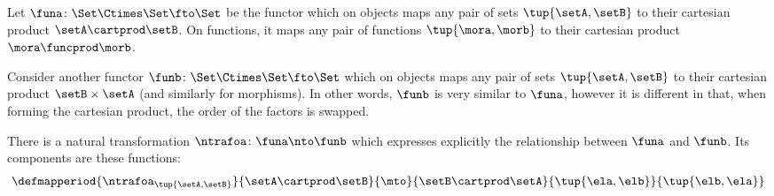 \begin{example}
    Let $\funa \colon \Set \Ctimes \Set \fto \Set$ be the functor which on objects maps any pair of sets $\tup{\setA, \setB}$ to their cartesian product $\setA \cartprod \setB$.
    On functions, it maps any pair of functions $\tup{\mora, \morb}$ to their cartesian product $\mora \funcprod \morb$.

    Consider another functor $\funb \colon \Set \Ctimes \Set \fto \Set$ which on objects maps any pair of sets $\tup{\setA, \setB}$ to their cartesian product $\setB \times \setA$ (and similarly for morphisms).
    In other words, $\funb$ is very similar to $\funa$, however it is different in that, when forming the cartesian product, the order of the factors is swapped.

    There is a natural transformation $\ntrafoa \colon \funa \nto \funb$ which expresses explicitly the relationship between $\funa$ and $\funb$.
    Its components are these functions:
    \begin{equation}\label{eq:symmetry-nat-trafo}
        \defmapperiod{\ntrafoa_{\tup{\setA, \setB}}}{\setA \cartprod \setB}{\mto }{\setB \cartprod \setA}{\tup{\ela, \elb}}{\tup{\elb, \ela}}
    \end{equation}

\end{example}

